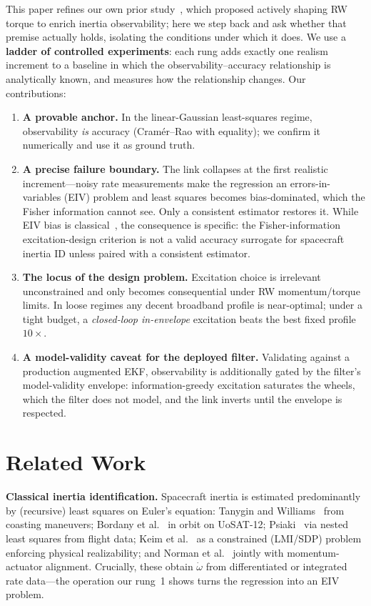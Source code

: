 \documentclass[conference]{IEEEtran}
\begin{document}
This paper refines our own prior study~\cite{elhariry2025towards}, which proposed actively shaping RW torque to enrich inertia observability; here we step back and ask whether that premise actually holds, isolating the conditions under which it does. We use a \textbf{ladder of controlled experiments}: each rung adds exactly one realism increment to a baseline in which the observability--accuracy relationship is analytically known, and measures how the relationship changes. Our contributions:
\begin{enumerate}
\item \textbf{A provable anchor.} In the linear-Gaussian least-squares regime, observability \emph{is} accuracy (Cram\'er--Rao with equality); we confirm it numerically and use it as ground truth.
\item \textbf{A precise failure boundary.} The link collapses at the first realistic increment---noisy rate measurements make the regression an errors-in-variables (EIV) problem and least squares becomes bias-dominated, which the Fisher information cannot see. Only a consistent estimator restores it. While EIV bias is classical~\cite{soderstrom2007errors,ljung1999system}, the consequence is specific: the Fisher-information excitation-design criterion is not a valid accuracy surrogate for spacecraft inertia ID unless paired with a consistent estimator.
\item \textbf{The locus of the design problem.} Excitation choice is irrelevant unconstrained and only becomes consequential under RW momentum/torque limits. In loose regimes any decent broadband profile is near-optimal; under a tight budget, a \emph{closed-loop in-envelope} excitation beats the best fixed profile $10\times$.
\item \textbf{A model-validity caveat for the deployed filter.} Validating against a production augmented EKF, observability is additionally gated by the filter's model-validity envelope: information-greedy excitation saturates the wheels, which the filter does not model, and the link inverts until the envelope is respected.
\end{enumerate}

\section{Related Work}
\textbf{Classical inertia identification.} Spacecraft inertia is estimated predominantly by (recursive) least squares on Euler's equation: Tanygin and Williams~\cite{tanygin1997mass} from coasting maneuvers; Bordany et al.~\cite{bordany2000inorbit} in orbit on UoSAT-12; Psiaki~\cite{psiaki2005estimation} via nested least squares from flight data; Keim et al.~\cite{keim2006constrained} as a constrained (LMI/SDP) problem enforcing physical realizability; and Norman et al.~\cite{norman2011inorbit} jointly with momentum-actuator alignment. Crucially, these obtain $\dot{\omega}$ from differentiated or integrated rate data---the operation our rung~1 shows turns the regression into an EIV problem.
\end{document}
